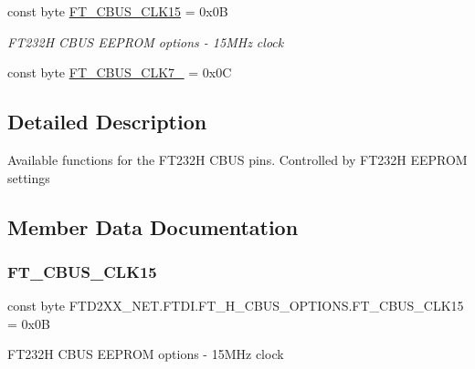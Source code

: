 \begin{DoxyCompactItemize}
const byte \mbox{\hyperlink{class_f_t_d2_x_x___n_e_t_1_1_f_t_d_i_1_1_f_t__232_h___c_b_u_s___o_p_t_i_o_n_s_a584690cda005b6a70888847058131ced}{F\+T\+\_\+\+C\+B\+U\+S\+\_\+\+C\+L\+K15}} = 0x0B
\begin{DoxyCompactList}\small\item\em F\+T232H C\+B\+US E\+E\+P\+R\+OM options -\/ 15M\+Hz clock \end{DoxyCompactList}\item 
const byte \mbox{\hyperlink{class_f_t_d2_x_x___n_e_t_1_1_f_t_d_i_1_1_f_t__232_h___c_b_u_s___o_p_t_i_o_n_s_a390039b24692cc001b1c450de79216cd}{F\+T\+\_\+\+C\+B\+U\+S\+\_\+\+C\+L\+K7\+\_}} = 0x0C
\end{DoxyCompactItemize}


\subsection{Detailed Description}
Available functions for the F\+T232H C\+B\+US pins. Controlled by F\+T232H E\+E\+P\+R\+OM settings 



\subsection{Member Data Documentation}
\mbox{\label{class_f_t_d2_x_x___n_e_t_1_1_f_t_d_i_1_1_f_t__232_h___c_b_u_s___o_p_t_i_o_n_s_a584690cda005b6a70888847058131ced}} 
\subsubsection{\texorpdfstring{FT\_CBUS\_CLK15}{FT\_CBUS\_CLK15}}
{\footnotesize\ttfamily const byte F\+T\+D2\+X\+X\+\_\+\+N\+E\+T.\+F\+T\+D\+I.\+F\+T\+\_\+H\+\_\+\+C\+B\+U\+S\+\_\+\+O\+P\+T\+I\+O\+N\+S.\+F\+T\+\_\+\+C\+B\+U\+S\+\_\+\+C\+L\+K15 = 0x0B}



F\+T232H C\+B\+US E\+E\+P\+R\+OM options -\/ 15M\+Hz clock 

\mbox{\label{class_f_t_d2_x_x___n_e_t_1_1_f_t_d_i_1_1_f_t__232_h___c_b_u_s___o_p_t_i_o_n_s_a23f3e0362a58e8b42cbb1d53c68bc156}} 
